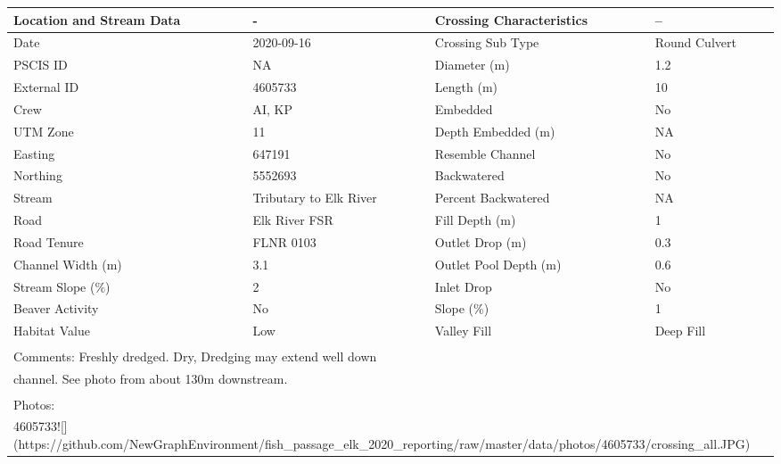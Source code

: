 \documentclass[
]{book}
\begin{document}
\begin{tabular}{l|l|l|l}
\hline
Location and Stream Data & - & Crossing Characteristics & --\\
\hline
Date & 2020-09-16 & Crossing Sub Type & Round Culvert\\
\hline
PSCIS ID & NA & Diameter (m) & 1.2\\
\hline
External ID & 4605733 & Length (m) & 10\\
\hline
Crew & AI, KP & Embedded & No\\
\hline
UTM Zone & 11 & Depth Embedded (m) & NA\\
\hline
Easting & 647191 & Resemble Channel & No\\
\hline
Northing & 5552693 & Backwatered & No\\
\hline
Stream & Tributary to Elk River & Percent Backwatered & NA\\
\hline
Road & Elk River FSR & Fill Depth (m) & 1\\
\hline
Road Tenure & FLNR 0103 & Outlet Drop (m) & 0.3\\
\hline
Channel Width (m) & 3.1 & Outlet Pool Depth (m) & 0.6\\
\hline
Stream Slope (\%) & 2 & Inlet Drop & No\\
\hline
Beaver Activity & No & Slope (\%) & 1\\
\hline
Habitat Value & Low & Valley Fill & Deep Fill\\
\hline
\multicolumn{4}{l}{\textsuperscript{} Comments: Freshly dredged. Dry, Dredging may extend well down}\\
\multicolumn{4}{l}{channel. See photo from about 130m downstream.}\\
\multicolumn{4}{l}{\textsuperscript{} Photos:}\\
\multicolumn{4}{l}{4605733![](https://github.com/NewGraphEnvironment/fish\_passage\_elk\_2020\_reporting/raw/master/data/photos/4605733/crossing\_all.JPG)}\\
\end{tabular}
\end{document}
